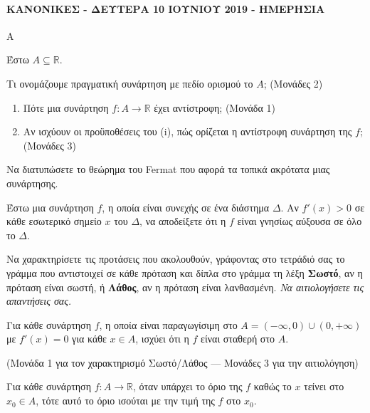 \paragraph{ΚΑΝΟΝΙΚΕΣ - ΔΕΥΤΕΡΑ 10 ΙΟΥΝΙΟΥ 2019 - ΗΜΕΡΗΣΙΑ}

\begin{thema}{Α}
\begin{erwthma}
    \item Έστω $A \subseteq \mathbb{R}$.
    \begin{alist}
        \item[α)] Τι ονομάζουμε πραγματική συνάρτηση με πεδίο ορισμού το $A$; \hfill(Μονάδες 2)
        \item[β)] \begin{enumerate}[label=\roman*.]
            \item Πότε μια συνάρτηση $f: A \to \mathbb{R}$ έχει αντίστροφη; \hfill(Μονάδα 1)
            \item Αν ισχύουν οι προϋποθέσεις του (i), πώς ορίζεται η αντίστροφη συνάρτηση της $f$; \hfill(Μονάδες 3)
        \end{enumerate}
    \end{alist}

    \item Να διατυπώσετε το θεώρημα του Fermat που αφορά τα τοπικά ακρότατα μιας συνάρτησης. 

    \item Έστω μια συνάρτηση $f$, η οποία είναι συνεχής σε ένα διάστημα $\Delta$. Αν $f'(x) > 0$ σε κάθε εσωτερικό σημείο $x$ του $\Delta$, να αποδείξετε ότι η $f$ είναι γνησίως αύξουσα σε όλο το $\Delta$. 

    \item Να χαρακτηρίσετε τις προτάσεις που ακολουθούν, γράφοντας στο τετράδιό σας το γράμμα που αντιστοιχεί σε κάθε πρόταση και δίπλα στο γράμμα τη λέξη \textbf{Σωστό}, αν η πρόταση είναι σωστή, ή \textbf{Λάθος}, αν η πρόταση είναι λανθασμένη. \textit{Να αιτιολογήσετε τις απαντήσεις σας.}
    \begin{alist}
        \item Για κάθε συνάρτηση $f$, η οποία είναι παραγωγίσιμη στο $A = (-\infty, 0) \cup (0, +\infty)$ με $f'(x) = 0$ για κάθε $x \in A$, ισχύει ότι η $f$ είναι σταθερή στο $A$.

        \hfill(Μονάδα 1 για τον χαρακτηρισμό Σωστό/Λάθος — Μονάδες 3 για την αιτιολόγηση)

        \item Για κάθε συνάρτηση $f: A \to \mathbb{R}$, όταν υπάρχει το όριο της $f$ καθώς το $x$ τείνει στο $x_0 \in A$, τότε αυτό το όριο ισούται με την τιμή της $f$ στο $x_0$.


\end{alist}
\end{erwthma}
\end{thema}

